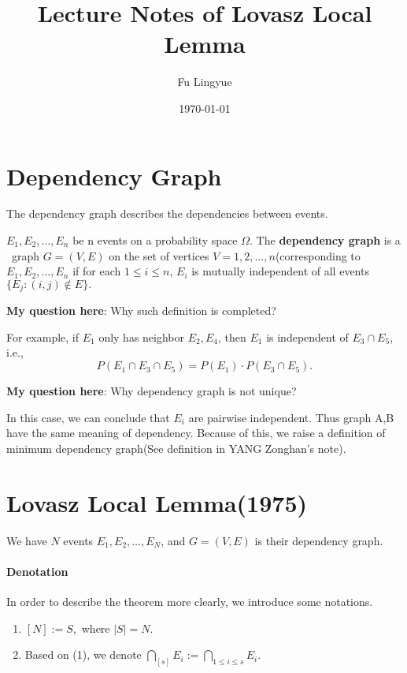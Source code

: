 
\title{Lecture Notes of Lovasz Local Lemma}
\author{Fu Lingyue}
\date{\today}


\maketitle

\section{Dependency Graph}
 The dependency graph describes the dependencies between events.
 
$E_1, E_2,\dots, E_n$ be n events on a probability space $\Omega$. The \textbf{dependency graph} is a \ graph $G = (V,E)$ on the set of vertices $V = 1,2,\dots, n$(corresponding to $E_1, E_2,\dots, E_n$ if for each $1\leq i \leq n$, $E_i$ is mutually independent of all events $\{E_j:(i,j)\notin E\}.$


\textbf{My question here}: Why such definition is completed?

For example, if $E_1$ only has neighbor $E_2,E_4$, then $E_1$ is independent of $E_3\cap E_5$, i.e.,
$$P(E_1\cap E_3 \cap E_5) = P(E_1) \cdot P(E_3 \cap E_5).$$

\textbf{My question here}: Why dependency graph is not unique? 
 
 In this case, we can conclude that $E_i$ are pairwise independent. Thus graph A,B have the same meaning of dependency. Because of this, we raise a definition of minimum dependency graph(See definition in YANG Zonghan's note).
 
 
\section{Lovasz Local Lemma(1975)}
We have $N$ events $E_1,E_2,\dots,E_N$, and $G = (V,E)$ is their dependency graph.

\paragraph{Denotation} In order to describe the theorem more clearly, we introduce some notations.
\begin{enumerate}
  \item $[N] := S,$ where $|S| = N.$
  \item Based on (1), we denote $\bigcap_{[s]}E_i := \bigcap_{1\leq i \leq s}E_i.$ 
\end{enumerate}




